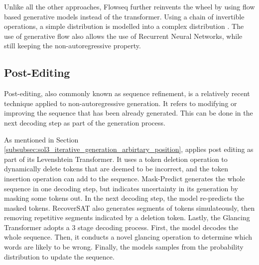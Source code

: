 Unlike all the other approaches, Flowseq \cite{ma_flowseq_2019} further reinvents the wheel by using flow based generative models \cite{rezende_variational_2016_flow} instead of the transformer. Using a chain of invertible operations, a simple distribution is modelled into a complex distribution \cite{ma_flowseq_2019}. The use of generative flow also allows the use of Recurrent Neural Networks, while still keeping the non-autoregressive property. 


\subsection{Post-Editing} \label{subsec:sol5_post_editing}
Post-editing, also commonly known as sequence refinement, is a relatively recent technique applied to non-autoregressive generation. It refers to modifying or improving the sequence that has been already generated. This can be done in the next decoding step as part of the generation process.

As mentioned in Section \ref{subsubsec:sol3_iterative_generation_arbirtary_position}, \textcite{gu_levenshtein_2019} applies post editing as part of its Levenshtein Transformer. It uses a token deletion operation to dynamically delete tokens that are deemed to be incorrect, and the token insertion operation can add to the sequence. 
Mask-Predict \cite{ghazvininejad_mask-predict_2019} generates the whole sequence in one decoding step, but indicates uncertainty in its generation by masking some tokens out. In the next decoding step, the model re-predicts the masked tokens. RecoverSAT \cite{ran_learning_to_recover_2020} also generates segments of tokens simulateously, then removing repetitive segments indicated by a deletion token. Lastly, the Glancing Transformer \cite{qian_glancing_2020} adopts a 3 stage decoding process. First, the model decodes the whole sequence. Then, it conducts a novel glancing operation to determine which words are likely to be wrong. Finally, the models samples from the probability distribution to update the sequence.
